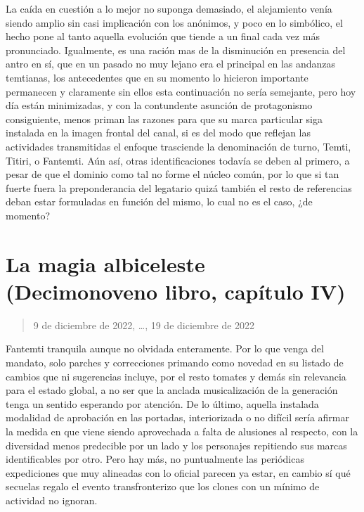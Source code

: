 \documentclass[
]{book}
\begin{document}
La caída en cuestión a lo mejor no suponga demasiado, el alejamiento venía siendo amplio sin casi implicación con los anónimos, y poco en lo simbólico, el hecho pone al tanto aquella evolución que tiende a un final cada vez más pronunciado. Igualmente, es una ración mas de la disminución en presencia del antro en sí, que en un pasado no muy lejano era el principal en las andanzas temtianas, los antecedentes que en su momento lo hicieron importante permanecen y claramente sin ellos esta continuación no sería semejante, pero hoy día están minimizadas, y con la contundente asunción de protagonismo consiguiente, menos priman las razones para que su marca particular siga instalada en la imagen frontal del canal, si es del modo que reflejan las actividades transmitidas el enfoque trasciende la denominación de turno, Temti, Titiri, o Fantemti. Aún así, otras identificaciones todavía se deben al primero, a pesar de que el dominio como tal no forme el núcleo común, por lo que si tan fuerte fuera la preponderancia del legatario quizá también el resto de referencias deban estar formuladas en función del mismo, lo cual no es el caso, ¿de momento?

\hypertarget{la-magia-albiceleste-decimonoveno-libro-capuxedtulo-iv}{%
\section{La magia albiceleste (Decimonoveno libro, capítulo IV)}\label{la-magia-albiceleste-decimonoveno-libro-capuxedtulo-iv}}

\begin{quote}
9 de diciembre de 2022, \ldots, 19 de diciembre de 2022
\end{quote}

Fantemti tranquila aunque no olvidada enteramente. Por lo que venga del mandato, solo parches y correcciones primando como novedad en su listado de cambios que ni sugerencias incluye, por el resto tomates y demás sin relevancia para el estado global, a no ser que la anclada musicalización de la generación tenga un sentido esperando por atención. De lo último, aquella instalada modalidad de aprobación en las portadas, interiorizada o no difícil sería afirmar la medida en que viene siendo aprovechada a falta de alusiones al respecto, con la diversidad menos predecible por un lado y los personajes repitiendo sus marcas identificables por otro. Pero hay más, no puntualmente las periódicas expediciones que muy alineadas con lo oficial parecen ya estar, en cambio sí qué secuelas regalo el evento transfronterizo que los clones con un mínimo de actividad no ignoran.
\end{document}
